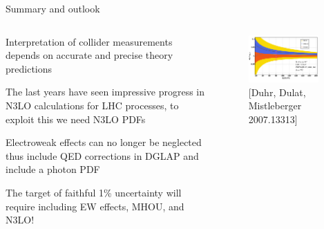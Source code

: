 \documentclass[aspectratio=169, 8pt,t]{beamer}
\begin{document}
\begin{frame}{Summary and outlook}

  \begin{columns}[T]
    \begin{column}{0.49\textwidth}
      \vspace*{1em}
      Interpretation of collider measurements depends on accurate and precise theory predictions
    
      \vspace*{1em}
      The last years have seen impressive progress in N3LO calculations for LHC processes, to exploit this we need N3LO PDFs
    
      \vspace*{1em}
      Electroweak effects can no longer be neglected thus include QED corrections in DGLAP and include a photon PDF
    
      \vspace*{1em}
      The target of faithful 1\% uncertainty will require including EW effects, MHOU, and N3LO!    
    \end{column}
    \begin{column}{0.49\textwidth}
      \begin{figure}
        \includegraphics[width=0.9\textwidth]{figures/n3lomistlberger.png}
        \caption*{\color{gray}\small [Duhr, Dulat, Mistleberger 2007.13313]}
      \end{figure}
    \end{column}
  \end{columns}

  \vspace*{2em}
\end{frame}
\end{document}
